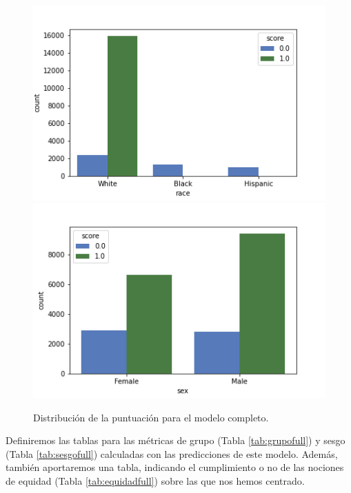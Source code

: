 \documentclass[oneside,openright,titlepage,numbers=noenddot,openany,headinclude,footinclude=true,
cleardoublepage=empty,abstractoff,BCOR=5mm,paper=a4,fontsize=12pt,main=spanish]{scrreprt}
\begin{document}
\begin{figure}[h]
      \includegraphics[width=\linewidth]{images/score_full_race_law.png}
    \endminipage\hfill
      \includegraphics[width=\linewidth]{images/score_full_sex_law.png}
    \endminipage
     \caption{Distribución de la puntuación para el modelo completo.}
     \label{fig:scorefull}
\end{figure}

Definiremos las tablas para las métricas de grupo (Tabla \ref{tab:grupofull}) y sesgo (Tabla \ref{tab:sesgofull}) calculadas con las predicciones de este modelo. Además, también aportaremos una tabla, indicando el cumplimiento o no de las nociones de equidad (Tabla \ref{tab:equidadfull}) sobre las que nos hemos centrado.\\
\end{document}
